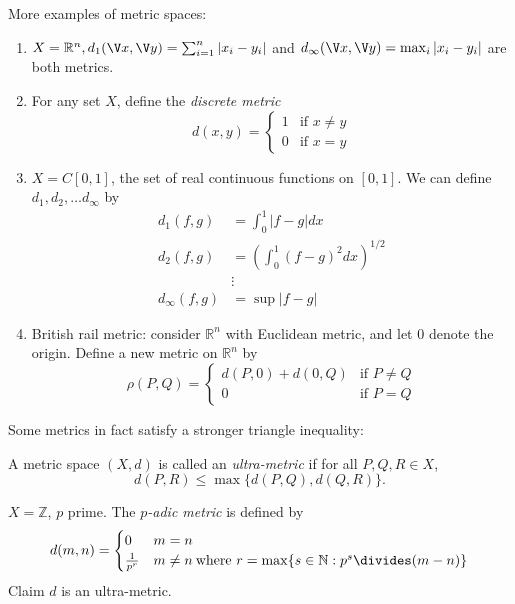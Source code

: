 \documentclass[a4paper]{article}
\begin{document}
More examples of metric spaces:
\begin{eg}\leavevmode
  \begin{enumerate}
  \item $X = \mathbb{R}^n, d_1(\V x,\V y) = \sum_{i=1}^n |x_i-y_i|$ and $d_\infty(\V x,\V y) = \max_i |x_i - y_i|$ are both metrics.
  \item For any set $X$, define the \emph{discrete metric}
    \[
      d(x, y) =
      \begin{cases}
        1 & \text{if } x \neq y \\
        0 & \text{if } x = y
      \end{cases}
    \]
  \item $X= C[0,1]$, the set of real continuous functions on $[0,1]$. We can define $d_1, d_2,\ldots d_\infty$ by
    \begin{align*}
      d_1(f,g) &= \int_0^1 |f-g| dx \\
      d_2(f,g) &= \left(\int_0^1(f-g)^2 dx\right)^{1/2} \\
      &\vdots \\
      d_\infty(f,g) &= \sup|f-g|
    \end{align*}
  \item British rail metric: consider $\mathbb{R}^n$ with Euclidean metric, and let $0$ denote the origin. Define a new metric on $\mathbb{R}^n$ by
    \[
      \rho(P,Q) =
      \begin{cases}
        d(P,0) + d(0,Q) &\text{if } P\neq Q \\
        0 &\text{if } P=Q
      \end{cases}
    \]
  \end{enumerate}
\end{eg}

Some metrics in fact satisfy a stronger triangle inequality:

\begin{definition}
  A metric space $(X,d)$ is called an \emph{ultra-metric} if for all \(P, Q, R \in X\),
  \[
    d(P,R) \leq \max\{d(P,Q), d(Q,R)\}.
  \]
\end{definition}

\begin{ex}
  $X = \mathbb{Z}$, $p$ prime. The \emph{$p$-adic metric} is defined by
  \[
    d(m,n) =
    \begin{cases}
      0 & m = n \\
      \frac{1}{p^r} & m \neq n \: \text{where } r = \max\{s\in\mathbb{N}: p^s \divides (m-n)\}
    \end{cases}
  \]
  Claim $d$ is an ultra-metric.
\end{ex}
\end{document}
